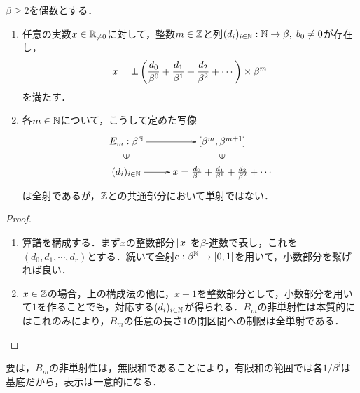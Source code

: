 \documentclass[uplatex, dvipdfmx]{jsreport}
\begin{document}
\begin{lemma}
    $\beta\ge 2$を偶数とする．
    \begin{enumerate}
        \item 任意の実数$x\in\mathbb{R}_{\ne 0}$に対して，整数$m\in\mathbb{Z}$と列$(d_i)_{i\in\mathbb{N}}:\mathbb{N}\to\beta,\;b_0\ne 0$が存在し，
        \[x=\pm\left(\frac{d_0}{\beta^0}+\frac{d_1}{\beta^1}+\frac{d_2}{\beta^2}+\cdots\right)\times\beta^m\]
        を満たす．
        \item 各$m\in\mathbb{N}$について，こうして定めた写像\[\xymatrix@R-2pc{
            E_m:\beta^\N\ar[r]&[\beta^{m},\beta^{m+1}]\\
            \rotatebox[origin=c]{90}{$\in$}&\rotatebox[origin=c]{90}{$\in$}\\
            (d_i)_{i\in\N}\ar@{|->}[r]&x=\frac{d_0}{\beta^0}+\frac{d_1}{\beta^1}+\frac{d_2}{\beta^2}+\cdots
        }\]
        は全射であるが，$\mathbb{Z}$との共通部分において単射ではない．
    \end{enumerate}
\end{lemma}
\begin{proof}\mbox{}
    \begin{enumerate}
        \item 算譜を構成する．まず$x$の整数部分$\lfloor x\rfloor$を$\beta$-進数で表し，これを$(d_0,d_1,\cdots,d_r)$とする．続いて全射$e:\beta^{\mathbb{N}}\to[0,1]$を用いて，小数部分を繋げれば良い．
        \item $x\in\mathbb{Z}$の場合，上の構成法の他に，$x-1$を整数部分として，小数部分を用いて$1$を作ることでも，対応する$(d_i)_{i\in\mathbb{N}}$が得られる．$B_m$の非単射性は本質的にはこれのみにより，$B_m$の任意の長さ$1$の閉区間への制限は全単射である．
    \end{enumerate}
\end{proof}
\begin{remarks}
    要は，$B_m$の非単射性は，無限和であることにより，有限和の範囲では各$1/\beta^i$は基底だから，表示は一意的になる．
\end{remarks}
\end{document}
